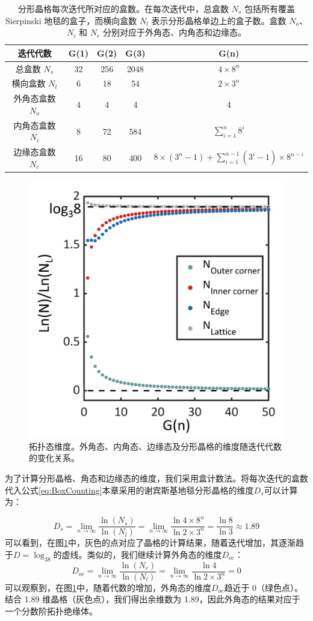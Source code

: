 \begin{table}[htbp]
    \centering
    \begin{tabular}{|c|c|c|c|c|}
        \hline
        迭代代数 & G(1) & G(2) & G(3) & G(n) \\
        \hline
        总盒数 \(N_s\) & 32 & 256 & 2048 & \(4 \times 8^n\) \\
        \hline
        横向盒数 \(N_l\) & 6 & 18 & 54 & \(2 \times 3^n\) \\
        \hline
        外角态盒数 \(N_o\) & 4 & 4 & 4 & 4 \\
        \hline
        内角态盒数 \(N_i\) & 8 & 72 & 584 & \(\sum_{i=1}^{n} 8^i\) \\
        \hline
        边缘态盒数 \(N_e\) & 16 & 80 & 400 & \(8 \times (3^n - 1) + \sum_{i=1}^{n-1} (3^i - 1) \times 8^{n-i}\) \\
        \hline
    \end{tabular}
    \caption{分形晶格每次迭代所对应的盒数。在每次迭代中，总盒数 \( N_s \) 包括所有覆盖 Sierpinski 地毯的盒子，而横向盒数 \( N_l \) 表示分形晶格单边上的盒子数。盒数 \( N_o \)、\( N_i \) 和 \( N_e \) 分别对应于外角态、内角态和边缘态。}
\label{tab:Generation}
\end{table}

\begin{figure}[htbp]
    \centering
    \includegraphics[width=0.5\linewidth]{figure/HOTITheo/Dimension.png}
    \caption{拓扑态维度。外角态、内角态、边缘态及分形晶格的维度随迭代代数的变化关系。}
    \label{fig:HOTIDimension}
\end{figure}

为了计算分形晶格、角态和边缘态的维度，我们采用盒计数法。将每次迭代的盒数代入公式\ref{eq:BoxCounting}本章采用的谢宾斯基地毯分形晶格的维度$D_s$可以计算为：

\begin{equation}
D_s = \lim_{n \to \infty} \frac{\ln (N_s)}{\ln (N_l)} = \lim_{n \to \infty} \frac{\ln 4 \times 8^n}{\ln 2 \times 3^n} = \frac{\ln 8}{\ln 3} \approx 1.89
\end{equation}
可以看到，在图\ref{fig:HOTIDimension}中，灰色的点对应了晶格的计算结果，随着迭代增加，其逐渐趋于$D=\log_38$的虚线。类似的，我们继续计算外角态的维度$D_{oc}$：
\begin{equation}
D_{oc} = \lim_{n \to \infty} \frac{\ln (N_c)}{\ln (N_l)} = \lim_{n \to \infty} \frac{\ln 4}{\ln 2 \times 3^n} = 0
\end{equation}
可以观察到，在图\ref{fig:HOTIDimension}中，随着代数的增加，外角态的维度$D_{oc}$趋近于 0（绿色点）。结合 1.89 维晶格（灰色点），我们得出余维数为 1.89，因此外角态的结果对应于一个分数阶拓扑绝缘体。

